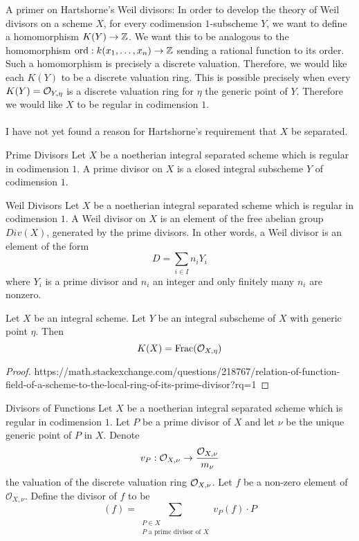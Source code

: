 \documentclass[a4paper]{article}
\begin{document}
A primer on Hartshorne's Weil divisors: In order to develop the theory of Weil divisors on a scheme $X$, for every codimension $1$-subscheme $Y$, we want to define a homomorphism $K(Y)\to\mathbb{Z}$. We want this to be analogous to the homomorphism $\text{ord}:k(x_1,\dots,x_n)\to\mathbb{Z}$ sending a rational function to its order. Such a homomorphism is precisely a discrete valuation. Therefore, we would like each $K(Y)$ to be a discrete valuation ring. This is possible precisely when every $K(Y)=\mathcal{O}_{Y,\eta}$ is a discrete valuation ring for $\eta$ the generic point of $Y$. Therefore we would like $X$ to be regular in codimension $1$. \\~\\

I have not yet found a reason for Hartshorne's requirement that $X$ be separated. 

\begin{defn}{Prime Divisors}{} Let $X$ be a noetherian integral separated scheme which is regular in codimension $1$. A prime divisor on $X$ is a closed integral subscheme $Y$ of codimension $1$. 
\end{defn}

\begin{defn}{Weil Divisors}{} Let $X$ be a noetherian integral separated scheme which is regular in codimension $1$. A Weil divisor on $X$ is an element of the free abelian group $Div(X)$, generated by the prime divisors. In other words, a Weil divisor is an element of the form $$D=\sum_{i\in I}n_iY_i$$ where $Y_i$ is a prime divisor and $n_i$ an integer and only finitely many $n_i$ are nonzero. 
\end{defn}

\begin{lmm}{}{} Let $X$ be an integral scheme. Let $Y$ be an integral subscheme of $X$ with generic point $\eta$. Then $$K(X)=\text{Frac}(\mathcal{O}_{X,\eta})$$ \tcbline
\begin{proof}
https://math.stackexchange.com/questions/218767/relation-of-function-field-of-a-scheme-to-the-local-ring-of-its-prime-divisor?rq=1
\end{proof}
\end{lmm}

\begin{defn}{Divisors of Functions}{} Let $X$ be a noetherian integral separated scheme which is regular in codimension $1$. Let $P$ be a prime divisor of $X$ and let $\nu$ be the unique generic point of $P$ in $X$. Denote $$v_P:\mathcal{O}_{X,\nu}\to\frac{\mathcal{O}_{X,\nu}}{m_\nu}$$ the valuation of the discrete valuation ring $\mathcal{O}_{X,\nu}$. Let $f$ be a non-zero element of $\mathcal{O}_{X,\nu}$. Define the divisor of $f$ to be $$(f)=\sum_{\substack{P\in X\\P \text{ a prime divisor of }X}}v_P(f)\cdot P$$ 
\end{defn}
\end{document}
